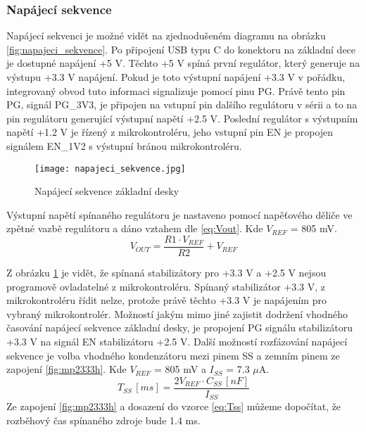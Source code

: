 	\subsubsection{Napájecí sekvence}
	Napájecí sekvenci je možné vidět na zjednodušeném diagramu na obrázku \ref{fig:napajeci_sekvence}. Po připojení USB typu C do konektoru na základní dece je dostupné napájení +5 V. Těchto +5 V spíná první regulátor, který generuje na výstupu +3.3 V napájení. Pokud je toto výstupní napájení +3.3 V v pořádku, integrovaný obvod tuto informaci signalizuje pomocí pinu PG. Právě tento pin PG, signál PG\_3V3, je připojen na vstupní pin dalšího regulátoru v sérii a to na pin regulátoru generující výstupní napětí +2.5 V. Poslední regulátor s výstupním napětí +1.2 V je řízený z mikrokontroléru, jeho vstupní pin EN je propojen signálem EN\_1V2 s výstupní bránou mikrokontroléru.
	\begin{figure}[h!]
		\centering
		\captionsetup{justification=centering}
		\texttt{[image: napajeci\_sekvence.jpg]}
		\caption{Napájecí sekvence základní desky} 
		\label{fig:napajeci_sekvecne}
	\end{figure}
	\par Výstupní napětí spínaného regulátoru je nastaveno pomocí napěťového děliče ve zpětné vazbě regulátoru a dáno vztahem dle \ref{eq:Vout}. Kde $V_{REF}$ = 805 mV.
	\begin{equation}
		V_{OUT} = \frac{R1 \cdot V_{REF}}{R2} + V_{REF}
		\label{eq:Vout}
	\end{equation}

	\par Z obrázku \ref{fig:napajeci_sekvecne} je vidět, že spínaná stabilizátory pro +3.3 V a +2.5 V nejsou programově ovladatelné z mikrokontroléru. Spínaný stabilizátor +3.3 V, z mikrokontroléru řídit nelze, protože právě těchto +3.3 V je napájením pro vybraný mikrokontrolér. Možností jakým mimo jiné zajistit dodržení vhodného časování napájecí sekvence základní desky, je propojení PG signálu stabilizátoru +3.3 V na signál EN stabilizátoru +2.5 V. Další možností rozfázování napájecí sekvence je volba vhodného kondenzátoru mezi pinem SS a zemním pinem ze zapojení \ref{fig:mp2333h}. Kde $V_{REF}$ = 805 mV a $I_{SS}$ = 7.3 $\mu$A.
	\begin{equation}
		T_{SS}\,[ms] = \frac{2V_{REF} \cdot C_{SS} \,[nF]}{I_{SS}}
		\label{eq:Tss}
	\end{equation}
	Ze zapojení \ref{fig:mp2333h} a dosazení do vzorce \ref{eq:Tss} můžeme dopočítat, že rozběhový čas spínaného zdroje bude 1.4 ms. %
	
